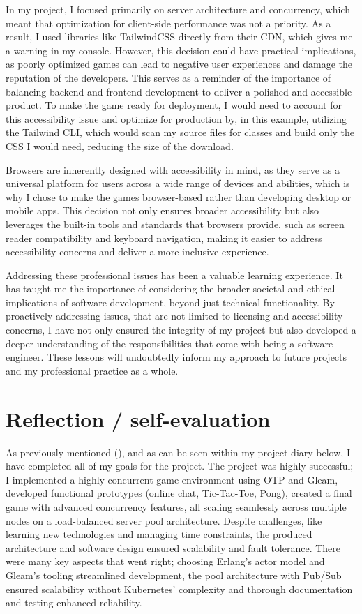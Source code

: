 \documentclass[]{final}
\begin{document}
In my project, I focused primarily on server architecture and concurrency,
which meant that optimization for client-side performance was not a
priority. As a result, I used libraries like TailwindCSS directly from
their CDN, which gives me a warning in my console.%
However, this decision could have practical implications,
as poorly optimized games can lead to negative user experiences and
damage the reputation of the developers. This serves as a reminder
of the importance of balancing backend and frontend development to
deliver a polished and accessible product. To make the game ready for
deployment, I would need to account for this accessibility issue and optimize for production
by, in this example, utilizing the Tailwind CLI, which would scan my source files for
classes and build only the CSS I would need, reducing the size of
the download.

Browsers are inherently designed with accessibility in mind, as they serve
as a universal platform for users across a wide range of devices and
abilities, which is why I chose to make the games browser-based rather than
developing desktop or mobile apps. This decision not only ensures broader
accessibility but also leverages the built-in tools and standards that
browsers provide, such as screen reader compatibility and keyboard navigation,
making it easier to address accessibility concerns and deliver a more
inclusive experience.

Addressing these professional issues has been a valuable learning experience.
It has taught me the importance of considering the broader societal and
ethical implications of software development, beyond just technical
functionality. By proactively addressing issues, that are not limited to
licensing and accessibility concerns, I have not only ensured the integrity of my
project but also developed a deeper understanding of the responsibilities
that come with being a software engineer. These lessons will
undoubtedly inform my approach to future projects and my professional
practice as a whole.

\chapter{Reflection / self-evaluation}

As previously mentioned {\hypersetup{linkcolor=teal}(\pageref{valkeyMessageBroker})}, and as can be seen within my project diary below,
I have completed all of my goals for the project.
The project was highly successful; I implemented a highly concurrent game environment
using OTP and Gleam, developed functional prototypes (online chat, Tic-Tac-Toe,
Pong), created a final game with advanced concurrency features, all scaling
seamlessly across multiple nodes on a load-balanced server pool architecture.
Despite challenges, like learning new technologies and managing time
constraints, the produced architecture and software design ensured
scalability and fault tolerance.
There were many key aspects that went right; choosing Erlang’s actor model
and Gleam’s tooling streamlined development,
the pool architecture with Pub/Sub ensured scalability without Kubernetes’
complexity and thorough documentation and testing enhanced reliability.
\end{document}
